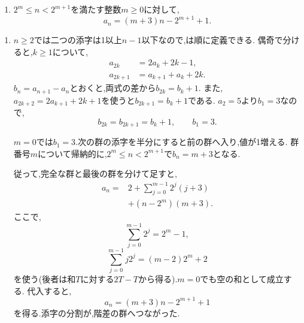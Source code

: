 \noindent {}\par\nobreak
\begin{enumerate}[label=(\arabic*),parsep=3pt,beginpenalty=10000,format=\bookitemlink{example-gauss-role-7}{answer}{solution}]
  \item $2^m\le n<2^{m+1}$を満たす整数$m\ge0$に対して,
    \[
      a_n=(m+3)n-2^{m+1}+1.
    \]
\end{enumerate}

\noindent {}\par\nobreak
\begin{enumerate}[label=(\arabic*),parsep=3pt,beginpenalty=10000,format=\bookitemlink{example-gauss-role-7}{solution}{problem}]
  \item $n\ge2$では二つの添字は1以上$n-1$以下なので,は順に定義できる.
    偶奇で分けると,$k\ge1$について,
    \[
      \begin{aligned}
        a_{2k}&=2a_k+2k-1,\\
        a_{2k+1}&=a_{k+1}+a_k+2k.
      \end{aligned}
    \]
    $b_n=a_{n+1}-a_n$とおくと,両式の差から$b_{2k}=b_k+1$.
    また,$a_{2k+2}=2a_{k+1}+2k+1$を使うと$b_{2k+1}=b_k+1$である.
    $a_2=5$より$b_1=3$なので,
    \[
      b_{2k}=b_{2k+1}=b_k+1,\qquad b_1=3.
    \]

    $m=0$では$b_1=3$.次の群の添字を半分にすると前の群へ入り,値が1増える.
    群番号$m$について帰納的に,$2^m\le n<2^{m+1}$で$b_n=m+3$となる.

    従って,完全な群と最後の群を分けて足すと,
    \begin{align*}
      a_n={}&2+\sum_{j=0}^{m-1}2^j(j+3)\\
      &+(n-2^m)(m+3).
    \end{align*}
    ここで,
    \[
      \sum_{j=0}^{m-1}2^j=2^m-1,
    \]
    \[
      \sum_{j=0}^{m-1}j2^j=(m-2)2^m+2
    \]
    を使う(後者は和$T$に対する$2T-T$から得る).$m=0$でも空の和として成立する.
    代入すると,
    \[
      a_n=(m+3)n-2^{m+1}+1
    \]
    を得る.添字の分割が,階差の群へつながった.
\end{enumerate}
